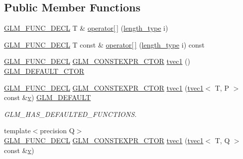 \subsection*{Public Member Functions}
\begin{DoxyCompactItemize}
\item 
\mbox{\hyperlink{setup_8hpp_ab2d052de21a70539923e9bcbf6e83a51}{G\+L\+M\+\_\+\+F\+U\+N\+C\+\_\+\+D\+E\+CL}} T \& \mbox{\hyperlink{structglm_1_1tvec1_a51ab9cbe89195b12a6f12e5f7fb11636}{operator\mbox{[}$\,$\mbox{]}}} (\mbox{\hyperlink{structglm_1_1tvec1_ae6254cf662020a8328b744b40f419527}{length\+\_\+type}} i)
\item 
\mbox{\hyperlink{setup_8hpp_ab2d052de21a70539923e9bcbf6e83a51}{G\+L\+M\+\_\+\+F\+U\+N\+C\+\_\+\+D\+E\+CL}} T const  \& \mbox{\hyperlink{structglm_1_1tvec1_a0c05545b98b1e81e1cfb1400f7c4cf5f}{operator\mbox{[}$\,$\mbox{]}}} (\mbox{\hyperlink{structglm_1_1tvec1_ae6254cf662020a8328b744b40f419527}{length\+\_\+type}} i) const
\item 
\mbox{\hyperlink{setup_8hpp_ab2d052de21a70539923e9bcbf6e83a51}{G\+L\+M\+\_\+\+F\+U\+N\+C\+\_\+\+D\+E\+CL}} \mbox{\hyperlink{setup_8hpp_ad34178a09666081abdb573c14d1f4a5a}{G\+L\+M\+\_\+\+C\+O\+N\+S\+T\+E\+X\+P\+R\+\_\+\+C\+T\+OR}} \mbox{\hyperlink{structglm_1_1tvec1_a7bc48ef6909364ad20e31831fa819bd8}{tvec1}} () \mbox{\hyperlink{setup_8hpp_afb97a4e995bc004c0cbbfa22125b80ba}{G\+L\+M\+\_\+\+D\+E\+F\+A\+U\+L\+T\+\_\+\+C\+T\+OR}}
\item 
\mbox{\hyperlink{setup_8hpp_ab2d052de21a70539923e9bcbf6e83a51}{G\+L\+M\+\_\+\+F\+U\+N\+C\+\_\+\+D\+E\+CL}} \mbox{\hyperlink{setup_8hpp_ad34178a09666081abdb573c14d1f4a5a}{G\+L\+M\+\_\+\+C\+O\+N\+S\+T\+E\+X\+P\+R\+\_\+\+C\+T\+OR}} \mbox{\hyperlink{structglm_1_1tvec1_a9a88135965c637f0926c293a039aedaa}{tvec1}} (\mbox{\hyperlink{structglm_1_1tvec1}{tvec1}}$<$ T, P $>$ const \&\mbox{\hyperlink{glad_8h_a14cfbe2fc2234f5504618905b69d1e06}{v}}) \mbox{\hyperlink{setup_8hpp_aefce7051c376a64ba89fa93a9f63bc2c}{G\+L\+M\+\_\+\+D\+E\+F\+A\+U\+LT}}
\begin{DoxyCompactList}\small\item\em G\+L\+M\+\_\+\+H\+A\+S\+\_\+\+D\+E\+F\+A\+U\+L\+T\+E\+D\+\_\+\+F\+U\+N\+C\+T\+I\+O\+NS. \end{DoxyCompactList}\item 
{\footnotesize template$<$precision Q$>$ }\\\mbox{\hyperlink{setup_8hpp_ab2d052de21a70539923e9bcbf6e83a51}{G\+L\+M\+\_\+\+F\+U\+N\+C\+\_\+\+D\+E\+CL}} \mbox{\hyperlink{setup_8hpp_ad34178a09666081abdb573c14d1f4a5a}{G\+L\+M\+\_\+\+C\+O\+N\+S\+T\+E\+X\+P\+R\+\_\+\+C\+T\+OR}} \mbox{\hyperlink{structglm_1_1tvec1_a1b75698ea6119a8360b81348a9fc4c17}{tvec1}} (\mbox{\hyperlink{structglm_1_1tvec1}{tvec1}}$<$ T, Q $>$ const \&\mbox{\hyperlink{glad_8h_a14cfbe2fc2234f5504618905b69d1e06}{v}})

\end{DoxyCompactItemize}
